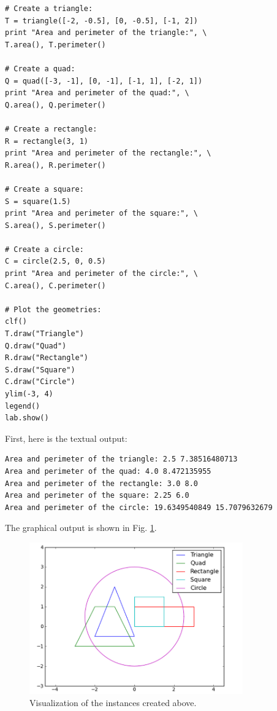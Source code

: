 \begin{verbatim}
# Create a triangle:
T = triangle([-2, -0.5], [0, -0.5], [-1, 2])
print "Area and perimeter of the triangle:", \
T.area(), T.perimeter()

# Create a quad:
Q = quad([-3, -1], [0, -1], [-1, 1], [-2, 1])
print "Area and perimeter of the quad:", \
Q.area(), Q.perimeter()
 
# Create a rectangle:
R = rectangle(3, 1)
print "Area and perimeter of the rectangle:", \
R.area(), R.perimeter()

# Create a square:
S = square(1.5)
print "Area and perimeter of the square:", \
S.area(), S.perimeter()
 
# Create a circle:
C = circle(2.5, 0, 0.5)
print "Area and perimeter of the circle:", \
C.area(), C.perimeter()

# Plot the geometries:
clf()
T.draw("Triangle")
Q.draw("Quad")
R.draw("Rectangle")
S.draw("Square")
C.draw("Circle")
ylim(-3, 4)
legend()
lab.show()
\end{verbatim}
First, here is the textual output:

\begin{verbatim}
Area and perimeter of the triangle: 2.5 7.38516480713
Area and perimeter of the quad: 4.0 8.472135955
Area and perimeter of the rectangle: 3.0 8.0
Area and perimeter of the square: 2.25 6.0
Area and perimeter of the circle: 19.6349540849 15.7079632679
\end{verbatim}
The graphical output is shown in Fig. \ref{fig:classes2}.

\begin{figure}[!ht]
\begin{center}
\includegraphics[width=0.82\textwidth]{imgp/classes2.png}
\end{center}
\vspace{-2mm}
\caption{Visualization of the instances created above.}
\label{fig:classes2}
\end{figure}




